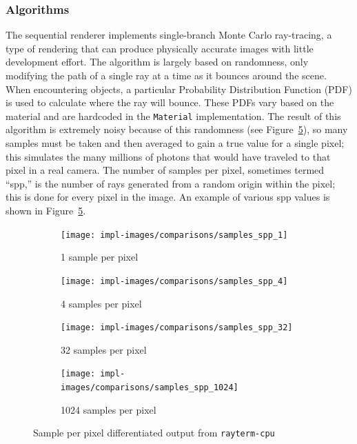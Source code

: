 \subsubsection{Algorithms} \label{ch:methods:renderer:sequential:algorithms}

The sequential renderer implements single-branch Monte Carlo ray-tracing, a type of rendering that can produce physically accurate images with little development effort.
The algorithm is largely based on randomness, only modifying the path of a single ray at a time as it bounces around the scene.
When encountering objects, a particular Probability Distribution Function (PDF) is used to calculate where the ray will bounce.
These PDFs vary based on the material and are hardcoded in the \texttt{Material} implementation.
The result of this algorithm is extremely noisy because of this randomness (see Figure~\ref{fig:rayterm-cpu_ppm_noisy}), so many samples must be taken and then averaged to gain a true value for a single pixel; this simulates the many millions of photons that would have traveled to that pixel in a real camera.
The number of samples per pixel, sometimes termed ``spp,'' is the number of rays generated from a random origin within the pixel; this is done for every pixel in the image.
An example of various spp values is shown in Figure~\ref{fig:rayterm-cpu_ppm_noisy}.

\vspace{0.3em}
\begin{figure}[htb]
  \centering
  \begin{subfigure}[htb]{0.45\textwidth}
    \texttt{[image: impl-images/comparisons/samples\_spp\_1]}
    \caption{1 sample per pixel}
\label{fig:rayterm-cpu_ppm_noisy_1}
  \end{subfigure}
  \hspace{1em}
  \begin{subfigure}[htb]{0.45\textwidth}
    \texttt{[image: impl-images/comparisons/samples\_spp\_4]}
    \caption{4 samples per pixel}
\label{fig:rayterm-cpu_ppm_noisy_4}
  \end{subfigure}
  \vspace{1em}
  \begin{subfigure}[htb]{0.45\textwidth}
    \texttt{[image: impl-images/comparisons/samples\_spp\_32]}
    \caption{32 samples per pixel}
\label{fig:rayterm-cpu_ppm_noisy_32}
  \end{subfigure}
  \hspace{1em}
  \begin{subfigure}[htb]{0.45\textwidth}
    \texttt{[image: impl-images/comparisons/samples\_spp\_1024]}
    \caption{1024 samples per pixel}
\label{fig:rayterm-cpu_ppm_noisy_1024}
  \end{subfigure}
  \caption{Sample per pixel differentiated output from \texttt{rayterm-cpu}}
\label{fig:rayterm-cpu_ppm_noisy}
\end{figure}

